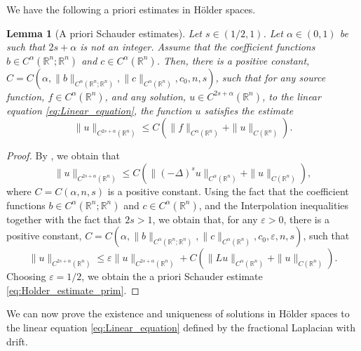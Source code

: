 \documentclass[11pt,reqno]{amsart}
\newtheorem{lem}[thm]{Lemma}
\theoremstyle{definition}
\theoremstyle{remark}
\begin{document}
We have the following a priori estimates in H\"older spaces.
\begin{lem}[A priori Schauder estimates]
\label{lem:Schauder_estimate}
Let $s\in(1/2,1)$. Let $\alpha \in (0,1)$ be such that $2s+\alpha$ is not an integer. Assume that the coefficient functions $b\in C^{\alpha}({\mathbb{R}}^n;{\mathbb{R}}^n)$ and $c \in C^{\alpha}({\mathbb{R}}^n)$. Then, there is a positive constant, $C=C(\alpha, \|b\|_{C^{\alpha}({\mathbb{R}}^n;{\mathbb{R}}^n)}, \|c\|_{C^{\alpha}({\mathbb{R}}^n)}, c_0, n, s)$, such that for any source function, $f \in C^{\alpha}({\mathbb{R}}^n)$, and any solution, $u \in C^{2s+\alpha}({\mathbb{R}}^n)$, to the linear equation \eqref{eq:Linear_equation}, the function $u$ satisfies the estimate
\begin{equation}
\label{eq:Holder_estimate_prim}
\|u\|_{C^{2s+\alpha}({\mathbb{R}}^n)} \leq C\left(\|f\|_{C^{\alpha}({\mathbb{R}}^n)}+\|u\|_{C({\mathbb{R}}^n)}\right).
\end{equation}
\end{lem}

\begin{proof}
By \cite[Proposition 2.8]{Silvestre_2007}, we obtain that
$$
\|u\|_{C^{2s+\alpha}({\mathbb{R}}^n)} \leq C\left(\|(-\Delta)^s u\|_{C^{\alpha}({\mathbb{R}}^n)}+\|u\|_{C({\mathbb{R}}^n)}\right),
$$
where $C=C(\alpha,n,s)$ is a positive constant. Using the fact that the coefficient functions $b \in C^{\alpha}({\mathbb{R}}^n;{\mathbb{R}}^n)$ and $c\in C^{\alpha}({\mathbb{R}}^n)$, and the Interpolation inequalities \cite[Theorems 3.2.1 \& 8.8.1]{Krylov_LecturesHolder} together with the fact that $2s>1$, we obtain that, for any ${\varepsilon}>0$, there is a positive constant, $C=C(\alpha, \|b\|_{C^{\alpha}({\mathbb{R}}^n;{\mathbb{R}}^n)}, \|c\|_{C^{\alpha}({\mathbb{R}}^n)}, c_0, {\varepsilon}, n, s)$, such that
$$
\|u\|_{C^{2s+\alpha}({\mathbb{R}}^n)} \leq {\varepsilon} \|u\|_{C^{2s+\alpha}({\mathbb{R}}^n)} +C\left(\|L u\|_{C^{\alpha}({\mathbb{R}}^n)}+\|u\|_{C({\mathbb{R}}^n)}\right).
$$
Choosing ${\varepsilon}=1/2$, we obtain the a priori Schauder estimate \eqref{eq:Holder_estimate_prim}.
\end{proof}

We can now prove the existence and uniqueness of solutions in H\"older spaces to the linear equation \eqref{eq:Linear_equation} defined by the fractional Laplacian with drift.
\end{document}
